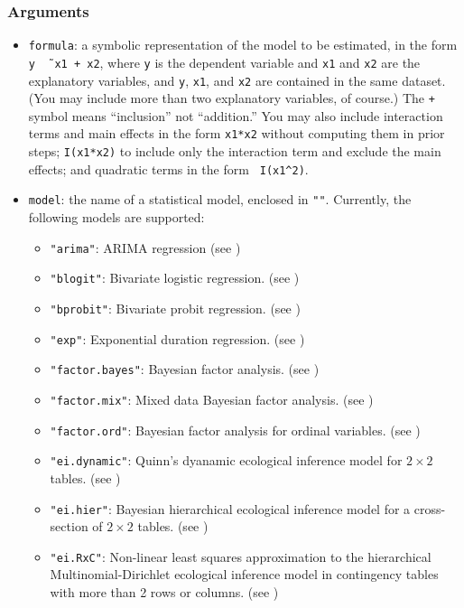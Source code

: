 \subsubsection{Arguments}
\begin{itemize}
\item{\tt formula}: a symbolic representation of the model to be
  estimated, in the form {\tt y \~\, x1 + x2}, where {\tt y} is the
  dependent variable and {\tt x1} and {\tt x2} are the explanatory
  variables, and {\tt y}, {\tt x1}, and {\tt x2} are contained in the
  same dataset.  (You may include more than two explanatory variables,
  of course.)  The {\tt +} symbol means ``inclusion'' not
  ``addition.''  You may also include interaction terms and main
  effects in the form {\tt x1*x2} without computing them in prior
  steps; {\tt I(x1*x2)} to include only the interaction term and
  exclude the main effects; and quadratic terms in the form {\tt
    I(x1\^{}2)}.   
\item{\tt model}: the name of a statistical model, enclosed in {\tt ""}.
  Currently, the following models are supported:
  \begin{itemize}
    \item {\tt "arima"}: ARIMA regression (see )
    \item {\tt "blogit"}: Bivariate logistic regression.  (see
      )
    \item {\tt "bprobit"}: Bivariate probit regression.  (see
      )
    \item {\tt "exp"}: Exponential duration regression.  (see
      )
    \item {\tt "factor.bayes"}: Bayesian factor analysis.  (see
)
    \item {\tt  "factor.mix"}: Mixed data Bayesian factor analysis.
(see )
    \item {\tt "factor.ord"}: Bayesian factor analysis for ordinal
variables.  (see )
    \item {\tt "ei.dynamic"}: Quinn's dyanamic ecological inference
model for $2 \times 2$ tables. (see )
    \item {\tt "ei.hier"}: Bayesian hierarchical ecological inference
model for a cross-section of $2 \times 2$ tables.  (see
)
    \item {\tt "ei.RxC"}: Non-linear least squares approximation to
the hierarchical Multinomial-Dirichlet ecological inference model in
contingency tables with more than 2 rows or columns.  (see )

\end{itemize}
\end{itemize}
